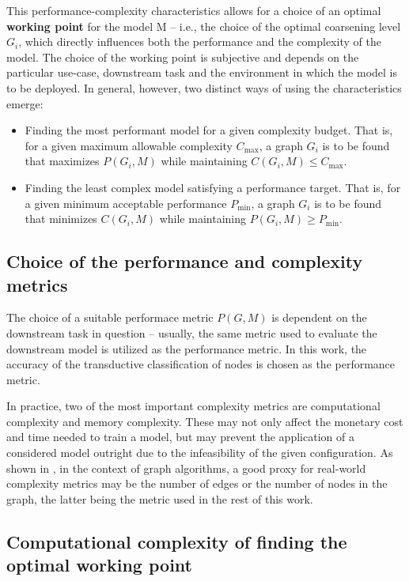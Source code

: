 \documentclass[sn-mathphys,pdflatex,iicol]{sn-jnl}%
\begin{document}
This performance-complexity characteristics allows for a choice of an optimal \textbf{working point} for the model M -- i.e., the choice of the optimal coarsening level \( G_i \), which directly influences both the performance and the complexity of the model. The choice of the working point is subjective and depends on the particular use-case, downstream task and the environment in which the model is to be deployed. In general, however, two distinct ways of using the characteristics emerge:
\begin{itemize}
  \item Finding the most performant model for a given complexity budget. That is, for a given maximum allowable complexity \( C_\mathrm{max} \), a graph \( G_i \) is to be found that maximizes \( P \left( G_i, M \right) \) while maintaining \( C \left( G_i, M \right) \leq C_\mathrm{max} \).
  \item Finding the least complex model satisfying a performance target. That is, for a given minimum acceptable performance \( P_\mathrm{min} \), a graph \( G_i \) is to be found that minimizes \( C \left( G_i, M \right) \) while maintaining \( P \left( G_i, M \right) \geq P_\mathrm{min} \).
\end{itemize}

\subsection{Choice of the performance and complexity metrics}

The choice of a suitable performace metric \( P \left( G, M \right) \) is dependent on the downstream task in question -- usually, the same metric used to evaluate the downstream model is utilized as the performance metric. In this work, the accuracy of the transductive classification of nodes is chosen as the performance metric.

In practice, two of the most important complexity metrics are computational complexity and memory complexity. These may not only affect the monetary cost and time needed to train a model, but may prevent the application of a considered model outright due to the infeasibility of the given configuration. As shown in \cite{chiang_cluster-gcn_2019}, in the context of graph algorithms, a good proxy for real-world complexity metrics may be the number of edges or the number of nodes in the graph, the latter being the metric used in the rest of this work.

\subsection{Computational complexity of finding the optimal working point}
\end{document}
